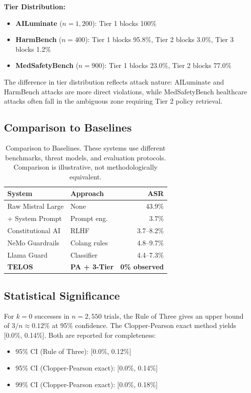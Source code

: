 \documentclass[11pt,twocolumn]{article}
\begin{document}
\textbf{Tier Distribution:}
\begin{itemize}
    \item \textbf{AILuminate} ($n=1,200$): Tier 1 blocks 100\%
    \item \textbf{HarmBench} ($n=400$): Tier 1 blocks 95.8\%, Tier 2 blocks 3.0\%, Tier 3 blocks 1.2\%
    \item \textbf{MedSafetyBench} ($n=900$): Tier 1 blocks 23.0\%, Tier 2 blocks 77.0\%
\end{itemize}

The difference in tier distribution reflects attack nature: AILuminate and HarmBench attacks are more direct violations, while MedSafetyBench healthcare attacks often fall in the ambiguous zone requiring Tier 2 policy retrieval.

\subsection{Comparison to Baselines}

\begin{table}[t]
\centering
\small
\caption{Comparison to Baselines. These systems use different benchmarks, threat models, and evaluation protocols. Comparison is illustrative, not methodologically equivalent.}
\label{tab:baselines}
\begin{tabular}{@{}llr@{}}
\toprule
\textbf{System} & \textbf{Approach} & \textbf{ASR} \\
\midrule
Raw Mistral Large & None & 43.9\% \\
\quad + System Prompt & Prompt eng. & 3.7\% \\
Constitutional AI & RLHF & 3.7--8.2\% \\
NeMo Guardrails & Colang rules & 4.8--9.7\% \\
Llama Guard & Classifier & 4.4--7.3\% \\
\textbf{TELOS} & \textbf{PA + 3-Tier} & \textbf{0\% observed} \\
\bottomrule
\end{tabular}
\end{table}

\subsection{Statistical Significance}

For $k=0$ successes in $n=2{,}550$ trials, the Rule of Three gives an upper bound of $3/n \approx 0.12\%$ at 95\% confidence. The Clopper-Pearson exact method yields [0.0\%, 0.14\%]. Both are reported for completeness:
\begin{itemize}
    \item 95\% CI (Rule of Three): [0.0\%, 0.12\%]
    \item 95\% CI (Clopper-Pearson exact): [0.0\%, 0.14\%]
    \item 99\% CI (Clopper-Pearson exact): [0.0\%, 0.18\%]
\end{itemize}
\end{document}
